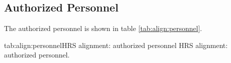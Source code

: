 {\newpage
\begin{safetyen}{10}{15}
\subsection{Authorized  Personnel} 
\end{safetyen}
The authorized personnel is shown in table \ref{tab:align:personnel}.
\begin{namestab}{tab:align:personnel}{HRS alignment: authorized personnel}{%
      HRS alignment: authorized personnel.}
\end{namestab}

} %
%
%
%
%
%
%
%
%
